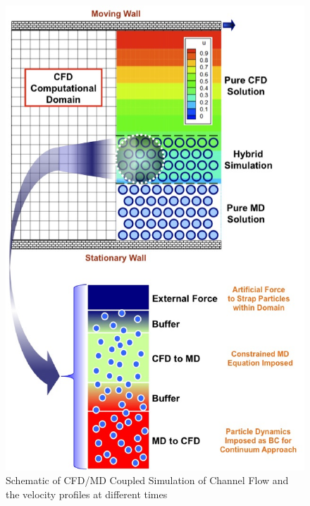 \documentclass[conference,final]{IEEEtran}
\begin{document}


\begin{figure}
\centering
\includegraphics[scale=0.33]{fig1.eps}
\caption{\small Schematic of CFD/MD Coupled Simulation of Channel Flow
  and the velocity profiles at different times}
\label{Fig:Couette}
\end{figure}
\end{document}
